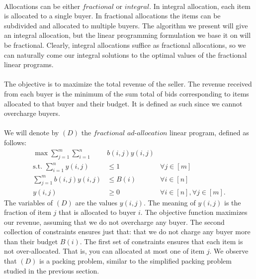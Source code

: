 \documentclass[letterpaper,12pt,oneside,onecolumn]{article}
\begin{document}
\paragraph{}
Allocations can be either $\textit{fractional}$ or $\textit{integral}$. In integral allocation, each item is allocated to a single buyer. In fractional allocations the items can be subdivided and allocated to multiple buyers. The algorithm we present will give an integral allocation, but the linear programming formulation we base it on will be fractional. Clearly, integral allocations suffice as fractional allocations, so we can naturally come our integral solutions to the optimal values of the fractional linear programs.
\paragraph{}
The objective is to maximize the total revenue of the seller. The revenue received from each buyer is the minimum of the sum total of bids corresponding to items allocated to that buyer and their budget. It is defined as such since we cannot overcharge buyers.
\paragraph{}
We will denote by $(D)$ the $\textit{fractional ad-allocation}$ linear program, defined as follows:
\begin{align*}
\max \sum_{j =1}^m \sum_{i=1}^n &b(i,j) y(i,j) \\
\text{s.t. } \sum_{i=1}^n y(i,j) &\leq 1 &\forall j \in [m] \\
\sum_{j=1}^m b(i,j)y(i,j) &\leq B(i) &\forall i \in [n] \\
y(i,j)&\geq 0 &\forall i \in [n], \forall j \in [m]. 
\end{align*}
The variables of $(D)$ are the values $y(i,j)$. The meaning of $y(i,j)$ is the fraction of item $j$ that is allocated to buyer $i$. The objective function maximizes our revenue, assuming that we do not overcharge any buyer. The second collection of constraints ensures just that: that we do not charge any buyer more than their budget $B(i)$. The first set of constraints ensures that each item is not over-allocated. That is, you can allocated at most one of item $j$. We observe that $(D)$ is a packing problem, similar to the simplified packing problem studied in the previous section.
\end{document}
